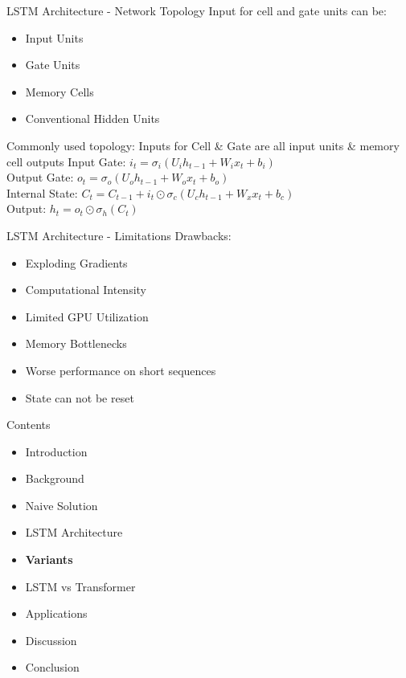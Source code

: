 \documentclass[10pt, aspectratio=169]{beamer}
\begin{document}
\begin{frame}[t]{LSTM Architecture - Network Topology}
Input for cell and gate units can be: \pause
\begin{itemize}
    \item Input Units \pause
    \item Gate Units \pause
    \item Memory Cells \pause
    \item Conventional Hidden Units \pause
\end{itemize}
Commonly used topology: Inputs for Cell \& Gate are all input units \& memory cell outputs \pause
Input Gate:  \begin{math}i_t=\sigma_i\left(U_{i}h_{t-1}+W_{i} x_t + b_i\right)\end{math}\pause\\
Output Gate: \begin{math}o_t=\sigma_o\left(U_{o}h_{t-1}+W_{o}x_t + b_o\right)\end{math}\pause\\
Internal State: \begin{math}C_t=C_{t-1}+i_t\odot\sigma_c\left(U_{c}h_{t-1}+W_{x}x_t + b_c\right)\end{math}\pause\\
Output: \begin{math}h_t=o_t\odot\sigma_h\left(C_t\right)\end{math}
\end{frame}

\begin{frame}[t]{LSTM Architecture - Limitations}
Drawbacks: \pause
\begin{itemize}
    \item Exploding Gradients \pause
    \item Computational Intensity \pause
    \item Limited GPU Utilization \pause
    \item Memory Bottlenecks \pause
    \item Worse performance on short sequences \pause
    \item State can not be reset \pause
\end{itemize}
\end{frame}

\begin{frame}[t]{Contents}
\begin{itemize}
    \item Introduction
    \item Background
    \item Naive Solution
    \item LSTM Architecture
    \item \textbf{Variants}
    \item LSTM vs Transformer
    \item Applications
    \item Discussion
    \item Conclusion
\end{itemize}
\end{frame}
\end{document}
